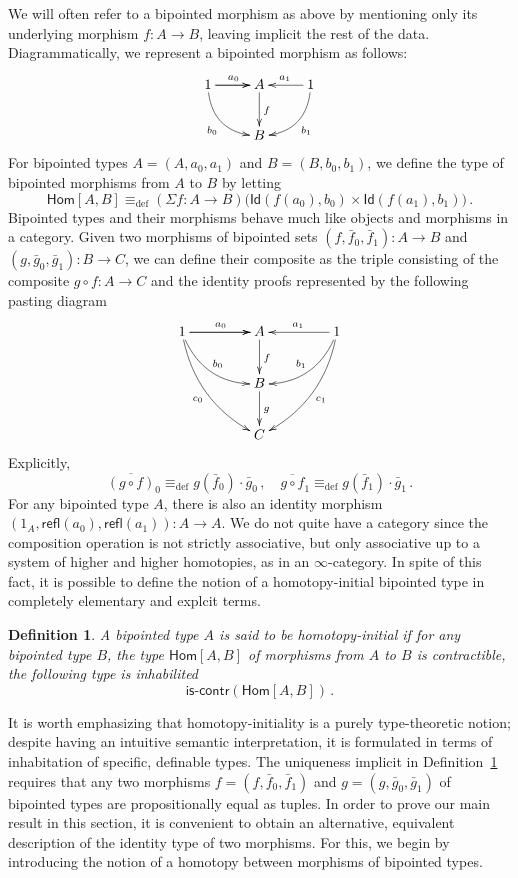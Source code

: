 \documentclass[reqno,10pt,a4paper,oneside]{amsart}
\numberwithin{equation}{section}
\theoremstyle{mythm}
\theoremstyle{mydef}
\newtheorem{definition}[theorem]{Definition}
\theoremstyle{myrmk}
\newcommand{\ie}{\text{i.e.\ }}
\newcommand{\deq}{\equiv}
\newcommand{\defeq}{\deq_{\mathrm{def}}}
\newcommand{\co}{\colon}
\newcommand{\iscontr}{\mathsf{is}\text{-}\mathsf{contr}}
\newcommand{\Id}{\mathsf{Id}}
\newcommand{\refl}{\mathsf{refl}}
\newcommand{\Hom}{\mathsf{Hom}}
\begin{document}
We will often refer to a bipointed morphism as above by mentioning only its underlying morphism $f \co A \to B$, leaving implicit
the rest of the data. Diagrammatically, we represent a bipointed morphism as follows:
\[
\xymatrix{
1 \ar[r]   \ar[r]^{a_0} \ar@/_1pc/[dr]_{b_0}  & A  \ar[d]^{f} & 1  \ar[l]_{a_1} \ar@/^1pc/[dl]^{b_1} \\
  & B  &  }
 \]
For bipointed types $A = (A, a_0, a_1)$ and $B = (B, b_0, b_1)$, we define the type of bipointed morphisms from $A$ to $B$ by letting
\[
\Hom[A,B] \defeq (\Sigma f \co A \to B) \big( \Id( f(a_0), b_0) \times \Id( f(a_1), b_1) \big) \, .
\]
Bipointed types and their morphisms behave much like objects and morphisms in a category.
Given two morphisms of bipointed sets $(f, \bar{f}_0, \bar{f}_1) \co A \to B$ and $(g, \bar{g}_0, \bar{g}_1) \co B \to C$, we can define their composite 
 as the triple consisting of the composite $g \circ f \co A \to C$ and the identity proofs represented
by the following pasting diagram
\[
\xymatrix@C=1.5cm{
1 \ar[r]   \ar[r]^{a_0}   \ar@/_1pc/[dr]^{b_0} \ar@/_1pc/[ddr]_{c_0}  & A  \ar[d]^{f} & 1 \ar[l]_{a_1}  \ar@/^1pc/[dl]_{b_1}  \ar@/^1pc/[ddl]^{c_1} \\
  & B \ar[d]^g &   \\
  & C &   }
  \]
Explicitly,
\[
\overline{(g \circ f)}_0 \defeq g(\bar{f}_0) \cdot  \bar{g}_0 \, ,   \quad 
\overline{g \circ f }_1 \defeq  g(\bar{f}_1) \cdot   \bar{g}_1 \, .
\]
For any bipointed type $A$, there is also an identity morphism $(1_A, \refl(a_0), \refl(a_1)) \co A \to A$. We do not quite have a 
category since the composition operation is not strictly associative, but only associative up to a system of higher and higher 
homotopies, as in an $\infty$-category. In spite of this fact, it is possible to define the notion of a homotopy-initial bipointed
type in completely elementary and explcit terms.



\begin{definition}\label{def:BoolInit}
A bipointed type $A$ is said to be \emph{homotopy-initial}  if for any bipointed type $B$, the type $\Hom[A,B]$ of morphisms from $A$ to $B$
is contractible, \ie the following type is inhabilited
\[
 \iscontr(\Hom[ A, B] ) \, .
\]  
\end{definition}


It is worth emphasizing that homotopy-initiality is a purely type-theoretic notion; despite having an intuitive semantic interpretation, it is formulated in terms of inhabitation of specific, definable types. The uniqueness implicit in Definition~\ref{def:BoolInit} requires that
any two morphisms $f = (f,\bar{f}_0,\bar{f}_1)$ and $g = (g,\bar{g}_0,\bar{g}_1)$ of bipointed types are propositionally equal as tuples.
 In order
to prove our main result in this section, it is convenient to obtain an alternative, equivalent description of the identity
type of two morphisms. For this, we begin by introducing the notion of a homotopy between morphisms of bipointed types. 
\end{document}
